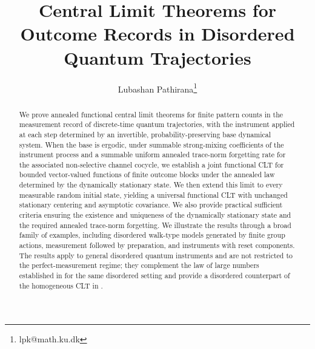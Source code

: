 \documentclass[a4paper]{article}
\title{Central Limit Theorems for Outcome Records in Disordered Quantum Trajectories}
\author[]{Lubashan Pathirana\thanks{lpk@math.ku.dk}}
\affil[]{Department of Mathematical Sciences and QMATH, University of Copenhagen, Denmark.}
\date{}
\numberwithin{equation}{section}   %
\theoremstyle{plain}   %
\theoremstyle{plain}   %
\theoremstyle{examplestyle}
\begin{document}
\lhead{\thepage}
\maketitle
\vspace{-1cm}


\begin{abstract}
    We prove annealed functional central limit theorems for finite pattern counts in the measurement record of discrete-time quantum trajectories, with the instrument applied at each step determined by an invertible, probability-preserving base dynamical system.
    When the base is ergodic, under summable strong-mixing coefficients of the instrument process and a summable uniform annealed trace-norm forgetting rate for the associated non-selective channel cocycle, we establish a joint functional CLT for bounded vector-valued functions of finite outcome blocks under the annealed law determined by the dynamically stationary state.
    We then extend this limit to every measurable random initial state, yielding a universal functional CLT with unchanged stationary centering and asymptotic covariance.
    We also provide practical sufficient criteria ensuring the existence and uniqueness of the dynamically stationary state and the required annealed trace-norm forgetting.
    We illustrate the results through a broad family of examples, including disordered walk-type models generated by finite group actions, measurement followed by preparation, and instruments with reset components.
    The results apply to general disordered quantum instruments and are not restricted to the perfect-measurement regime; they complement the law of large numbers established in \cite{qtlln} for the same disordered setting and provide a disordered counterpart of the homogeneous CLT in \cite{Attal_2014}.
\end{abstract}



\end{document}
